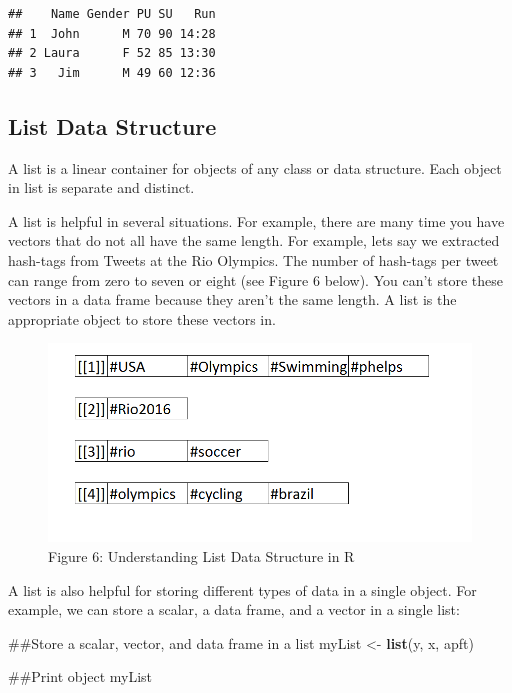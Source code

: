 \documentclass[]{book}
\newenvironment{Shaded}{\begin{snugshade}}{\end{snugshade}}
\newcommand{\KeywordTok}[1]{\textcolor[rgb]{0.13,0.29,0.53}{\textbf{{#1}}}}
\newcommand{\StringTok}[1]{\textcolor[rgb]{0.31,0.60,0.02}{{#1}}}
\newcommand{\NormalTok}[1]{{#1}}
\begin{document}
\begin{verbatim}
##    Name Gender PU SU   Run
## 1  John      M 70 90 14:28
## 2 Laura      F 52 85 13:30
## 3   Jim      M 49 60 12:36
\end{verbatim}

\subsection{List Data Structure}\label{list-data-structure}

A list is a linear container for objects of any class or data structure.
Each object in list is separate and distinct.

A list is helpful in several situations. For example, there are many
time you have vectors that do not all have the same length. For example,
lets say we extracted hash-tags from Tweets at the Rio Olympics. The
number of hash-tags per tweet can range from zero to seven or eight (see
Figure 6 below). You can't store these vectors in a data frame because
they aren't the same length. A list is the appropriate object to store
these vectors in.

\begin{figure}[htbp]
\centering
\includegraphics{list.PNG}
\caption{Figure 6: Understanding List Data Structure in R}
\end{figure}

A list is also helpful for storing different types of data in a single
object. For example, we can store a scalar, a data frame, and a vector
in a single list:

\begin{Shaded}
\begin{Highlighting}[]
\NormalTok{##Store a scalar, vector, and data frame in a list}
\NormalTok{myList <-}\StringTok{ }\KeywordTok{list}\NormalTok{(y, x, apft)}

\NormalTok{##Print object}
\NormalTok{myList}
\end{Highlighting}
\end{Shaded}
\end{document}
